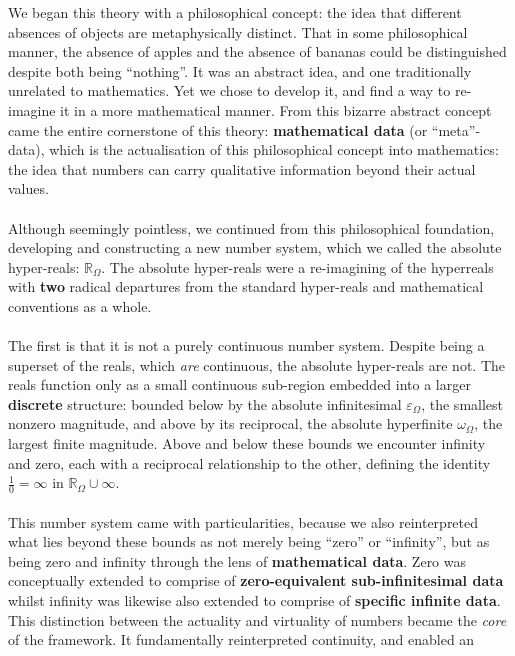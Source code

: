 \documentclass{article}
\begin{document}
We began this theory with a philosophical concept: the idea that different 
absences of objects are metaphysically distinct. That in some philosophical 
manner, the absence of apples and the absence of bananas could be 
distinguished despite both being ``nothing''. It was an abstract idea, and 
one traditionally unrelated to mathematics. Yet we chose to develop it, and 
find a way to re-imagine it in a more mathematical manner. From this bizarre 
abstract concept came the entire cornerstone of this theory: \textbf{mathematical 
data} (or ``meta''-data), which is the actualisation of this philosophical concept 
into mathematics: the idea that numbers can carry qualitative information 
beyond their actual values.
\\\\Although seemingly pointless, we continued from this philosophical foundation, 
developing and constructing a new number system, which we called the absolute 
hyper-reals: $\mathbb{R}_\Omega$. The absolute hyper-reals were a re-imagining of the 
hyperreals with \textbf{two} radical departures from the standard hyper-reals and mathematical conventions as a whole.
\\\\The first is that it is not a purely continuous number system. Despite being 
a superset of the reals, which \textit{are} continuous, the absolute 
hyper-reals are not. The reals function only as a small continuous sub-region 
embedded into a larger \textbf{discrete} structure: bounded below by the 
absolute infinitesimal $\varepsilon_\Omega$, the smallest nonzero magnitude, 
and above by its reciprocal, the absolute hyperfinite $\omega_\Omega$, the 
largest finite magnitude. Above and below these bounds we encounter infinity 
and zero, each with a reciprocal relationship to the other, defining the 
identity $\frac{1}{0} = \infty$ in $\mathbb{R}_\Omega \cup \infty$.
\\\\This number system came with particularities, because we also reinterpreted 
what lies beyond these bounds as not merely being ``zero'' or ``infinity'', but as being zero and infinity through the lens of \textbf{mathematical data}. Zero was conceptually extended to comprise of \textbf{zero-equivalent 
sub-infinitesimal data} whilst infinity was likewise also extended to comprise of \textbf{specific infinite data}. This distinction 
between the actuality and virtuality of numbers became the \textit{core} of the 
framework. It fundamentally reinterpreted continuity, and enabled an 
\end{document}
